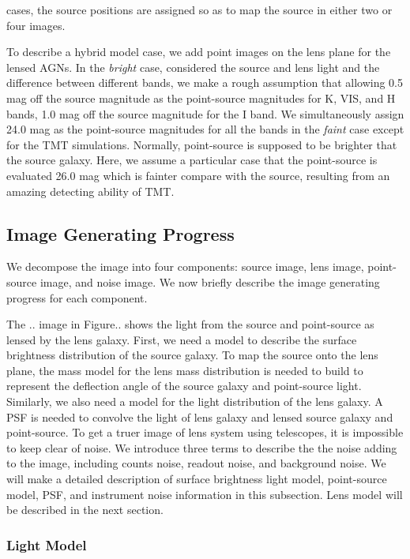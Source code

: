 \documentclass[a4paper,11pt]{article}
\begin{document}
cases, the source positions are assigned so as to map the source in either two or four images.

To describe a hybrid model case, we add point images on the lens plane for the lensed AGNs. In the \textit{bright} case, considered the source and lens light and the difference between different bands, we make a rough assumption that allowing 0.5 mag off the source magnitude as the point-source magnitudes for K, VIS, and H bands, 1.0 mag off the source magnitude for the I band. We simultaneously assign 24.0 mag as the point-source magnitudes for all the bands in the \textit{faint} case except for the TMT simulations. Normally, point-source is supposed to be brighter that the source galaxy. Here, we assume a particular case that the point-source is evaluated 26.0 mag which is fainter compare with the source, resulting from an amazing detecting ability of TMT.

\subsection{Image Generating Progress}
We decompose the image into four components: source image, lens image, point-source image, and noise image. We now briefly describe the image generating progress for each component. 

The .. image in Figure.. shows the light from the source and point-source as lensed by the lens galaxy. First, we need a model to describe the surface brightness distribution of the source galaxy. To map the source onto the lens plane, the mass model for the lens mass distribution is needed to build to represent the deflection angle of the source galaxy and point-source light. Similarly, we also need a model for the light distribution of the lens galaxy. A PSF is needed to convolve the light of lens galaxy and lensed source galaxy and point-source. To get a truer image of lens system using telescopes, it is impossible to keep clear of noise. We introduce three terms to describe the the noise adding to the image, including counts noise, readout noise, and background noise. We will make a detailed description of surface brightness light model, point-source model, PSF, and instrument noise information in this subsection. Lens model will be described in the next section.

\subsubsection{Light Model}
\end{document}
